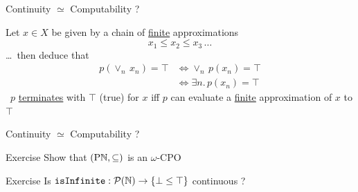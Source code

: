 \documentclass{beamer}
\begin{document}
\begin{frame}{Continuity $\simeq$ Computability ?}

        \begin{center}
        \end{center}

        \medskip
        Let $x \in X$ be given by a chain of \alert{\underline{finite}} approximations
        \[
                x_1 \leq x_2 \leq x_3 \, \dots
        \]
        \dots\ then deduce that
        \begin{align*}
                p(\vee_{n}\, x_n) = \top & \Longleftrightarrow \vee_{n}\, p(x_n) = \top
                \\
                                                   & \Longleftrightarrow \exists n.\, p(x_n) = \top
        \end{align*}
        \pause
        \ie\ $p$ \alert{\underline{terminates}} with $\top$ (true) for
        $x$ iff $p$ can evaluate a \alert{\underline{finite}} approximation of
        $x$ to $\top$
\end{frame}

\begin{frame}{Continuity $\simeq$ Computability ?}
        
        \begin{block}{Exercise}
                Show that $(\mathrm{P} \mathbb{N}, \subseteq)$ is an $\omega$-CPO
        \end{block}

        \begin{block}{Exercise}
                Is $\mathtt{isInfinite} : \mathcal{P}(\mathbb{N}) \to \{
                \bot \leq \top \}$ continuous ?
        \end{block}
\end{frame}
\end{document}
